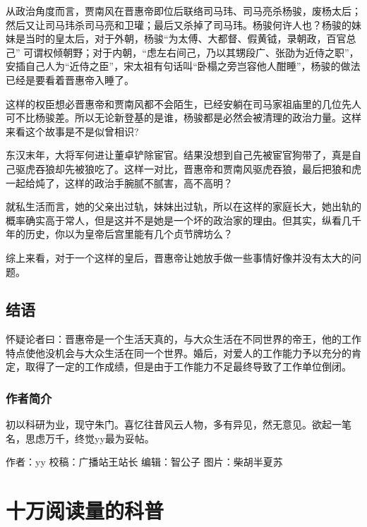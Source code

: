 \documentclass[]{book}
\begin{document}
从政治角度而言，贾南风在晋惠帝即位后联络司马玮、司马亮杀杨骏，废杨太后；然后又让司马玮杀司马亮和卫瓘；最后又杀掉了司马玮。杨骏何许人也？杨骏的妹妹是当时的皇太后，对于外朝，杨骏``为太傅、大都督、假黄钺，录朝政，百官总己''
可谓权倾朝野；对于内朝，``虑左右间己，乃以其甥段广、张劭为近侍之职''，安插自己人为``近侍之臣''，宋太祖有句话叫``卧榻之旁岂容他人酣睡''，杨骏的做法已经是要看着晋惠帝入睡了。

这样的权臣想必晋惠帝和贾南风都不会陌生，已经安躺在司马家祖庙里的几位先人可不比杨骏差。所以无论新登基的是谁，杨骏都是必然会被清理的政治力量。这样来看这个故事是不是似曾相识?

东汉末年，大将军何进让董卓铲除宦官。结果没想到自己先被宦官狗带了，真是自己驱虎吞狼却先被狼吃了。这样一对比，晋惠帝和贾南风驱虎吞狼，最后把狼和虎一起给炖了，这样的政治手腕腻不腻害，高不高明？

就私生活而言，她的父亲出过轨，妹妹出过轨，所以在这样的家庭长大，她出轨的概率确实高于常人，但是这并不是她是一个坏的政治家的理由。但其实，纵看几千年的历史，你以为皇帝后宫里能有几个贞节牌坊么？

综上来看，对于一个这样的皇后，晋惠帝让她放手做一些事情好像并没有太大的问题。

\subsection{结语}\label{-4}

怀疑论者曰：晋惠帝是一个生活天真的，与大众生活在不同世界的帝王，他的工作特点使他没机会与大众生活在同一个世界。婚后，对爱人的工作能力予以充分的肯定，取得了一定的工作成绩，但是由于工作能力不足最终导致了工作单位倒闭。

\subsubsection*{作者简介}

初以科研为业，现守朱门。喜忆往昔风云人物，多有异见，然无意见。欲起一笔名，思虑万千，终觉yy最为妥帖。

作者：yy 校稿：广播站王站长 编辑：智公子 图片：柴胡半夏苏

\section{十万阅读量的科普}
\end{document}
